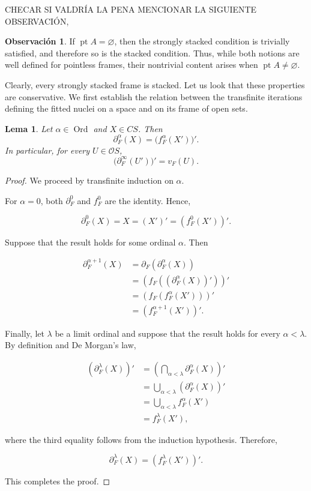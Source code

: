 \documentclass[11pt]{amsart}
\DeclareMathOperator{\pt}{pt}
\DeclareMathOperator{\Ord}{Ord}
\theoremstyle{plain}
\newtheorem{lem}[thm]{Lema}
\theoremstyle{definition}
\newtheorem{obs}[thm]{Observación}
\begin{document}
CHECAR SI VALDRÍA LA PENA MENCIONAR LA SIGUIENTE OBSERVACIÓN,
\begin{obs}\label{Obs2}
If $\pt A=\varnothing$, then the strongly stacked condition is trivially
satisfied, and therefore so is the stacked condition. Thus, while both
notions are well defined for pointless frames, their nontrivial content
arises when $\pt A\neq\varnothing$.
\end{obs}

Clearly, every strongly stacked frame is stacked. Let us look that these properties are conservative. 
We first establish the relation between the transfinite iterations defining the fitted nuclei on a space and
on its frame of open sets.

\begin{lem}\label{inducciontransfinita}
Let $\alpha\in \Ord$ and $X\in CS$. Then
\[
\partial_F^\alpha(X)=\big(f_F^\alpha(X')\big)'.
\]
In particular, for every \(U\in\mathcal{O}S\),
\[
    \bigl(\partial_F^\infty(U')\bigr)'=v_F(U).
\]
\end{lem}

\begin{proof}
We proceed by transfinite induction on \(\alpha\).

For \(\alpha=0\), both \(\partial_F^0\) and \(f_F^0\) are the identity. Hence,

\[
\partial_F^0(X)
=X
=(X')'
=\left(f_F^0(X')\right)'.
\]

Suppose that the result holds for some ordinal \(\alpha\). Then

\[
\begin{aligned}
\partial_F^{\alpha+1}(X)
&=\partial_F\left(\partial_F^\alpha(X)\right)\\
&=\left(f_F\left(\left(\partial_F^\alpha(X)\right)'\right)\right)'\\
&=\left(f_F\left(f_F^\alpha(X')\right)\right)'\\
&=\left(f_F^{\alpha+1}(X')\right)'.
\end{aligned}
\]

Finally, let \(\lambda\) be a limit ordinal and suppose that the result holds for every \(\alpha<\lambda\). By definition and De Morgan's law,

\[
\begin{aligned}
\left(\partial_F^\lambda(X)\right)'
&=
\left(\bigcap_{\alpha<\lambda}\partial_F^\alpha(X)\right)'\\
&=
\bigcup_{\alpha<\lambda}
\left(\partial_F^\alpha(X)\right)'\\
&=
\bigcup_{\alpha<\lambda}
f_F^\alpha(X')\\
&=
f_F^\lambda(X'),
\end{aligned}
\]

where the third equality follows from the induction hypothesis. Therefore,

\[
\partial_F^\lambda(X)
=
\left(f_F^\lambda(X')\right)'.
\]

This completes the proof.
\end{proof}
\end{document}

